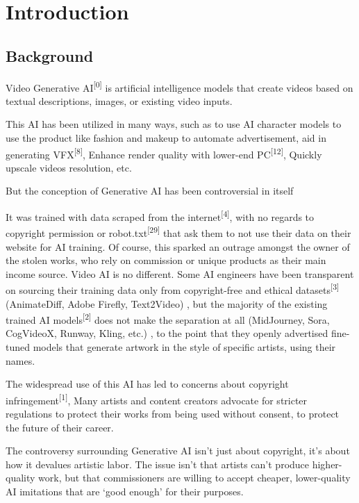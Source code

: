 \chapter{Introduction}
\label{chap:introduction}

\section{Background}
\label{section:background}

Video Generative AI\textsuperscript{[0]} is artificial intelligence models that create videos based on textual descriptions, images, or existing video inputs. \newline

This AI has been utilized in many ways, such as to use AI character models to use the product like fashion and makeup to automate advertisement, aid in generating VFX\textsuperscript{[8]}, Enhance render quality with lower-end PC\textsuperscript{[12]}, Quickly upscale videos resolution, etc.\newline

But the conception of Generative AI has been controversial in itself

It was trained with data scraped from the internet\textsuperscript{[4]}, with no regards to copyright permission or robot.txt\textsuperscript{[29]} that ask them to not use their data on their website for AI training. Of course, this sparked an outrage amongst the owner of the stolen works, who rely on commission or unique products as their main income source. Video AI is no different. Some AI engineers have been transparent on sourcing their training data only from copyright-free and ethical datasets\textsuperscript{[3]} (AnimateDiff, Adobe Firefly, Text2Video) , but the majority of the existing trained AI models\textsuperscript{[2]} does not make the separation at all (MidJourney, Sora, CogVideoX, Runway, Kling, etc.) , to the point that they openly advertised fine-tuned models that generate artwork in the style of specific artists, using their names.\newline

The widespread use of this AI has led to concerns about copyright infringement\textsuperscript{[1]}, Many artists and content creators advocate for stricter regulations to protect their works from being used without consent, to protect the future of their career. \newline

The controversy surrounding Generative AI isn’t just about copyright, it’s about how it devalues artistic labor. The issue isn’t that artists can’t produce higher-quality work, but that commissioners are willing to accept cheaper, lower-quality AI imitations that are ‘good enough’ for their purposes.\newline


